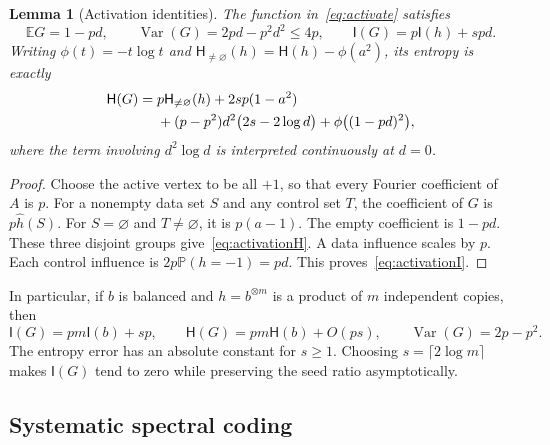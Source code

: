 \documentclass[11pt]{amsart}
\newtheorem{lemma}[theorem]{Lemma}
\theoremstyle{definition}
\theoremstyle{remark}
\newcommand{\E}{\mathbb E}
\renewcommand{\P}{\mathbb P}
\newcommand{\HH}{\mathsf H}
\newcommand{\I}{\mathsf I}
\newcommand{\wh}[1]{\widehat{#1}}
\newcommand{\Var}{\operatorname{Var}}
\begin{document}
\begin{lemma}[Activation identities]\label{lem:activation}
The function in~\eqref{eq:activate} satisfies
\begin{equation}\label{eq:activationI}
 \E G=1-pd,\qquad \Var(G)=2pd-p^2d^2\le4p,
 \qquad \I(G)=p\I(h)+sp d.
\end{equation}
Writing $\phi(t)=-t\log t$ and $\HH_{\ne\varnothing}(h)=\HH(h)-\phi(a^2)$, its entropy is exactly
\begin{align}
 \HH(G)={}&p\HH_{\ne\varnothing}(h)+2sp(1-a^2)\notag\\
 &+(p-p^2)d^2\bigl(2s-2\log d\bigr)
   +\phi\bigl((1-pd)^2\bigr),\label{eq:activationH}
\end{align}
where the term involving $d^2\log d$ is interpreted continuously at $d=0$.
\end{lemma}
\begin{proof}
Choose the active vertex to be all $+1$, so that every Fourier coefficient of $A$ is $p$. For a nonempty data set $S$ and any control set $T$, the coefficient of $G$ is $p\wh h(S)$. For $S=\varnothing$ and $T\ne\varnothing$, it is $p(a-1)$. The empty coefficient is $1-pd$. These three disjoint groups give~\eqref{eq:activationH}. A data influence scales by $p$. Each control influence is $2p\P(h=-1)=pd$. This proves~\eqref{eq:activationI}.
\end{proof}

In particular, if $b$ is balanced and $h=b^{\otimes m}$ is a product of $m$ independent copies, then
\begin{equation}\label{eq:balancedactivation}
 \I(G)=pm\I(b)+sp,\qquad
 \HH(G)=pm\HH(b)+O(ps),\qquad
 \Var(G)=2p-p^2.
\end{equation}
The entropy error has an absolute constant for $s\ge1$. Choosing $s=\lceil2\log m\rceil$ makes $\I(G)$ tend to zero while preserving the seed ratio asymptotically.

\subsection{Systematic spectral coding}
\end{document}
